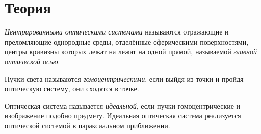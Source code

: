 \section*{Теория}

\textit{Центрированными оптическими системами} называются отражающие и преломляющие однородные среды, отделённые сферическими поверхностями, центры кривизны которых лежат на лежат на одной прямой, называемой \textit{главной оптической осью}.

Пучки света называются \textit{гомоцентрическими}, если выйдя из точки и пройдя оптическую систему, они сходятся в точке.

Оптическая система называется \textit{идеальной}, если пучки гомоцентрические и изображение подобно предмету. Идеальная оптическая система реализуется оптической системой в параксиальном приближении.

